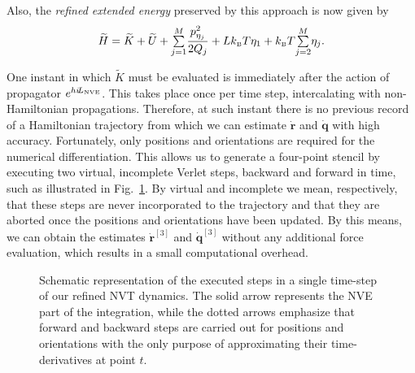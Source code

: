 \documentclass[
	aip,
	jcp,
	reprint,
]{revtex4-1}
\newcommand{\vt}[1]{\boldsymbol{\mathbf{#1}}}          %
\newcommand{\Liu}[1]{i\!L_\text{#1}}                   %
\newcommand{\timestep}{h}
\newcommand{\refined}[1]{\widetilde{#1}}
\begin{document}
Also, the \textit{refined extended energy} preserved by this approach is now given by
\begin{equation}
\label{eq:this extended energy}
{\refined H} = \refined K + \refined U + {\textstyle\sum\limits_{j=1}^{M}} \frac{p_{\eta_j}^2}{2Q_j} + L k_\text{\tiny B} T\eta_1 + k_\text{\tiny B} T {\textstyle\sum\limits_{j=2}^{M}} \eta_j.
\end{equation}

One instant in which $\refined K$ must be evaluated is immediately after the action of propagator $e^{\timestep \Liu{\tiny NVE}}$.
This takes place once per time step, intercalating with non-Hamiltonian propagations.
Therefore, at such instant there is no previous record of a Hamiltonian trajectory from which we can estimate $\dot{\vt r}$ and $\dot{\vt q}$ with high accuracy.
Fortunately, only positions and orientations are required for the numerical differentiation.
This allows us to generate a four-point stencil by executing two virtual, incomplete Verlet steps, backward and forward in time, such as illustrated in Fig.~\ref{fig:virtual steps}.
By virtual and incomplete we mean, respectively, that these steps are never incorporated to the trajectory and that they are aborted once the positions and orientations have been updated.
By this means, we can obtain the estimates $\dot{\vt r}^{[3]}$ and $\dot{\vt q}^{[3]}$ without any additional force evaluation, which results in a small computational overhead.

\begin{figure}
\caption{Schematic representation of the executed steps in a single time-step of our refined NVT dynamics.
The solid arrow represents the NVE part of the integration, while the dotted arrows emphasize that forward and backward steps are carried out for positions and orientations with the only purpose of approximating their time-derivatives at point $t$.}
\label{fig:virtual steps}
\end{figure}
\end{document}
